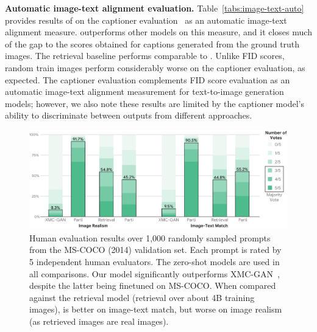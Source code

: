 \textbf{Automatic image-text alignment evaluation.}
Table~\ref{tabs:image-text-auto} provides results of \bdraw on the captioner evaluation~\cite{Cho2022DallEval} as an automatic image-text alignment measure. \bdraw outperforms other models on this measure, and it closes much of the gap to the scores obtained for captions generated from the ground truth images. The retrieval baseline performs comparable to \bdraw. Unlike FID scores, random train images perform considerably worse on the captioner evaluation, as expected. The captioner evaluation complements FID score evaluation as an automatic image-text alignment measurement for text-to-image generation models; however, we also note these results are limited by the captioner model's~\cite{cho2021vlt5} ability to discriminate between outputs from different approaches.



\begin{figure}[tbh!]
    \centering
    \includegraphics[width=1.0\textwidth]{figures/human_evals_coco.pdf}
    \caption{Human evaluation results over 1,000 randomly sampled prompts from the MS-COCO (2014) validation set. Each prompt is rated by 5 independent human evaluators. The zero-shot \bdraw models are used in all comparisons. Our model significantly outperforms XMC-GAN~\cite{zhang2021cross}, despite the latter being finetuned on MS-COCO. When compared against the retrieval model (retrieval over about 4B training images), \bdraw is better on image-text match, but worse on image realism (as retrieved images are real images).}
    \label{fig:human_evals_coco}
\end{figure}

